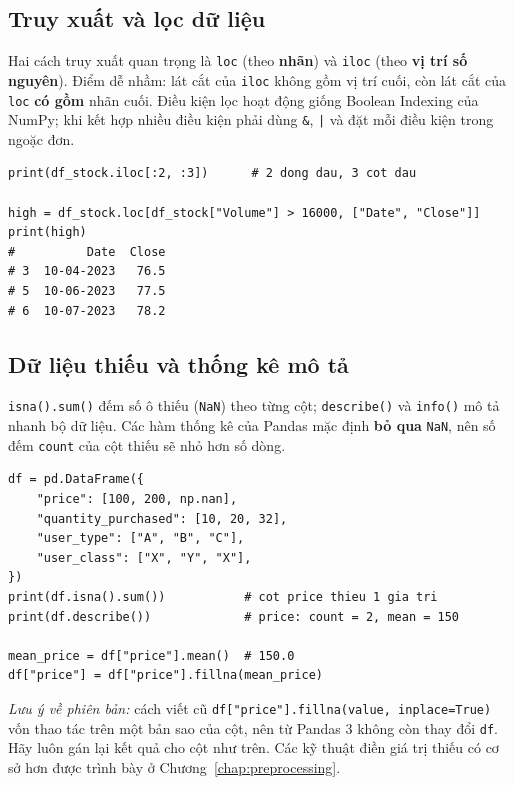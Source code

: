 \subsection{Truy xuất và lọc dữ liệu}

Hai cách truy xuất quan trọng là \texttt{loc} (theo \textbf{nhãn}) và \texttt{iloc} (theo \textbf{vị trí số nguyên}). Điểm dễ nhầm: lát cắt của \texttt{iloc} không gồm vị trí cuối, còn lát cắt của \texttt{loc} \textbf{có gồm} nhãn cuối. Điều kiện lọc hoạt động giống Boolean Indexing của NumPy; khi kết hợp nhiều điều kiện phải dùng \texttt{\&}, \texttt{|} và đặt mỗi điều kiện trong ngoặc đơn.

\begin{lstlisting}[caption={Truy xuất bằng iloc, loc và điều kiện lọc}]
print(df_stock.iloc[:2, :3])      # 2 dong dau, 3 cot dau

high = df_stock.loc[df_stock["Volume"] > 16000, ["Date", "Close"]]
print(high)
#          Date  Close
# 3  10-04-2023   76.5
# 5  10-06-2023   77.5
# 6  10-07-2023   78.2
\end{lstlisting}

\subsection{Dữ liệu thiếu và thống kê mô tả}

\texttt{isna().sum()} đếm số ô thiếu (\texttt{NaN}) theo từng cột; \texttt{describe()} và \texttt{info()} mô tả nhanh bộ dữ liệu. Các hàm thống kê của Pandas mặc định \textbf{bỏ qua} \texttt{NaN}, nên số đếm \texttt{count} của cột thiếu sẽ nhỏ hơn số dòng.

\begin{lstlisting}[caption={Phát hiện và điền dữ liệu thiếu}]
df = pd.DataFrame({
    "price": [100, 200, np.nan],
    "quantity_purchased": [10, 20, 32],
    "user_type": ["A", "B", "C"],
    "user_class": ["X", "Y", "X"],
})
print(df.isna().sum())           # cot price thieu 1 gia tri
print(df.describe())             # price: count = 2, mean = 150

mean_price = df["price"].mean()  # 150.0
df["price"] = df["price"].fillna(mean_price)
\end{lstlisting}

\noindent\textit{Lưu ý về phiên bản:} cách viết cũ \texttt{df["price"].fillna(value, inplace=True)} vốn thao tác trên một bản sao của cột, nên từ Pandas 3 không còn thay đổi \texttt{df}. Hãy luôn gán lại kết quả cho cột như trên. Các kỹ thuật điền giá trị thiếu có cơ sở hơn được trình bày ở Chương~\ref{chap:preprocessing}.

